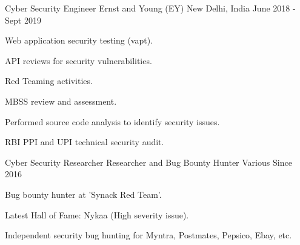 \begin{cventries}
  \cventry
    {Cyber Security Engineer} %
    {Ernst and Young (EY)} %
    {New Delhi, India} %
    {June 2018 - Sept 2019} %
    {
      \begin{cvitems} %
        \item {Web application security testing (vapt).}
        \item {API reviews for security vulnerabilities.}
        \item {Red Teaming activities.}
        \item {MBSS review and assessment.}
        \item {Performed source code analysis to identify security issues.}
        \item {RBI PPI and UPI technical security audit.}
      \end{cvitems}
    }

  \cventry
    {Cyber Security Researcher} %
    {Researcher and Bug Bounty Hunter} %
    {Various} %
    {Since 2016} %
    {
      \begin{cvitems} %
        \item {Bug bounty hunter at 'Synack Red Team'.}
        \item {Latest Hall of Fame: Nykaa (High severity issue).}
        \item {Independent security bug hunting for Myntra, Postmates, Pepsico, Ebay, etc.}
      \end{cvitems}
    }

\end{cventries}
